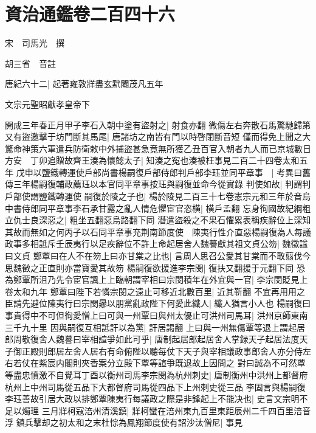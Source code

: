 \chapter{資治通鑑卷二百四十六}
宋　司馬光　撰

胡三省　音註

唐紀六十二|{
	起著雍敦牂盡玄黓閹茂凡五年}


文宗元聖昭獻孝皇帝下

開成三年春正月甲子李石入朝中塗有盜射之|{
	射食亦翻}
微傷左右奔散石馬驚馳歸第又有盜邀擊于坊門斷其馬尾|{
	唐諸坊之南皆有門以時啓閉斷音短}
僅而得免上聞之大驚命神策六軍遣兵防衛敕中外捕盜甚急竟無所獲乙丑百官入朝者九人而已京城數日方安　丁卯追贈故齊王湊為懷懿太子|{
	知湊之寃也湊被枉事見二百二十四卷太和五年}
戊申以鹽鐵轉運使戶部尚書楊嗣復戶部侍郎判戶部李珏並同平章事　|{
	考異曰舊傳三年楊嗣復輔政薦珏以本官同平章事按珏與嗣復並命今從實錄}
判使如故|{
	判謂判戶部使謂鹽鐵轉運使}
嗣復於陵之子也|{
	楊於陵見二百三十七卷憲宗元和三年於音烏}
中書侍郎同平章事李石承甘露之亂人情危懼宦官恣横|{
	横戶孟翻}
忘身徇國故紀綱粗立仇士良深惡之|{
	粗坐五翻惡烏路翻下同}
潛遣盜殺之不果石懼累表稱疾辭位上深知其故而無如之何丙子以石同平章事充荆南節度使　陳夷行性介直惡楊嗣復為人每議政事多相詆斥壬辰夷行以足疾辭位不許上命起居舍人魏謩獻其祖文貞公笏|{
	魏徵諡曰文貞}
鄭覃曰在人不在笏上曰亦甘棠之比也|{
	言周人思召公愛其甘棠而不敢翦伐今思魏徵之正直則亦當寶愛其故笏}
楊嗣復欲援進李宗閔|{
	復扶又翻援于元翻下同}
恐為鄭覃所沮乃先令宦官諷上上臨朝謂宰相曰宗閔積年在外宜與一官|{
	李宗閔貶見上卷太和九年}
鄭覃曰陛下若憐宗閔之遠止可移近北數百里|{
	近其靳翻}
不宜再用用之臣請先避位陳夷行曰宗閔曏以朋黨亂政陛下何愛此纖人|{
	纖人猶言小人也}
楊嗣復曰事貴得中不可但徇愛憎上曰可與一州覃曰與州太優止可洪州司馬耳|{
	洪州京師東南三千九十里}
因與嗣復互相詆訐以為黨|{
	訐居謁翻}
上曰與一州無傷覃等退上謂起居郎周敬復舍人魏謩曰宰相諠爭如此可乎|{
	唐制起居郎起居舍人掌録天子起居法度天子御正殿則郎居左舍人居右有命俯陛以聽每仗下天子與宰相議政事郎舍人亦分侍左右若仗在紫宸内閣則夾香案分立殿下覃等諠爭既退故上因問之}
對曰誠為不可然覃等盡忠憤激不自覺耳丁酉以衡州司馬李宗閔為杭州刺史|{
	唐制衡州中洪州上都督府杭州上中州司馬從五品下大都督府司馬從四品下上州刺史從三品}
李固言與楊嗣復李珏善故引居大政以排鄭覃陳夷行每議政之際是非鋒起上不能决也|{
	史言文宗明不足以燭理}
三月牂柯寇涪州清溪鎮|{
	牂柯蠻在涪州東九百里東距辰州二千四百里涪音浮}
鎮兵擊却之初太和之末杜悰為鳳翔節度使有詔沙汰僧尼|{
	事見}


